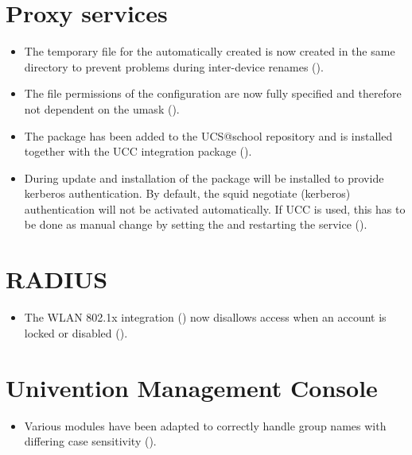 \section{Proxy services}
\begin{itemize}
\item The temporary file for the automatically created  is now created in the same directory to prevent problems during inter-device renames ().
\item The file permissions of the  configuration are now fully specified and therefore not dependent on the umask ().
\item The package  has been added to the
UCS@school repository and is installed together with the UCC integration
package  ().
\item During update and installation of \ucsUAS{} the package  will be
  installed to provide kerberos authentication. By default, the squid negotiate (kerberos) authentication will
  not be activated automatically. If UCC is used, this has to be done as manual change by setting the
   and restarting the service  ().
\end{itemize}

\section{RADIUS}
\begin{itemize}
\item The WLAN 802.1x integration () now disallows access when an account is locked or disabled ().
\end{itemize}

%

\section{Univention Management Console}
\begin{itemize}
\item Various  modules have been adapted to correctly handle group names with differing case sensitivity ().
\end{itemize}

